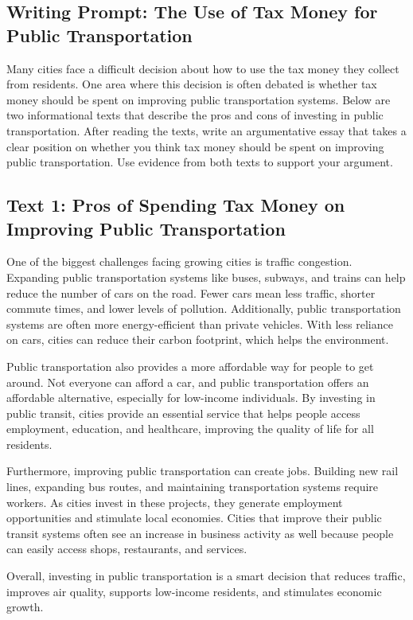 \documentclass[12pt]{article}
\begin{document}
\onehalfspacing

\subsection*{Writing Prompt: The Use of Tax Money for Public Transportation}

Many cities face a difficult decision about how to use the tax money they collect from residents. One area where this decision is often debated is whether tax money should be spent on improving public transportation systems. Below are two informational texts that describe the pros and cons of investing in public transportation. After reading the texts, write an argumentative essay that takes a clear position on whether you think tax money should be spent on improving public transportation. Use evidence from both texts to support your argument.

\subsection*{Text 1: Pros of Spending Tax Money on Improving Public Transportation}

\begin{tcolorbox}[colframe=black!40, colback=gray!5]
\begin{spacing}{1.15}
    One of the biggest challenges facing growing cities is traffic congestion. Expanding public transportation systems like buses, subways, and trains can help reduce the number of cars on the road. Fewer cars mean less traffic, shorter commute times, and lower levels of pollution. Additionally, public transportation systems are often more energy-efficient than private vehicles. With less reliance on cars, cities can reduce their carbon footprint, which helps the environment.

    Public transportation also provides a more affordable way for people to get around. Not everyone can afford a car, and public transportation offers an affordable alternative, especially for low-income individuals. By investing in public transit, cities provide an essential service that helps people access employment, education, and healthcare, improving the quality of life for all residents.

    Furthermore, improving public transportation can create jobs. Building new rail lines, expanding bus routes, and maintaining transportation systems require workers. As cities invest in these projects, they generate employment opportunities and stimulate local economies. Cities that improve their public transit systems often see an increase in business activity as well because people can easily access shops, restaurants, and services.

    Overall, investing in public transportation is a smart decision that reduces traffic, improves air quality, supports low-income residents, and stimulates economic growth.
\end{spacing}
\end{tcolorbox}
\end{document}

